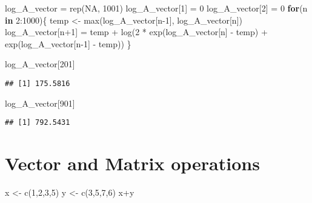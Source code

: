 \documentclass[
]{article}
\newenvironment{Shaded}{\begin{snugshade}}{\end{snugshade}}
\newcommand{\ConstantTok}[1]{\textcolor[rgb]{0.00,0.00,0.00}{#1}}
\newcommand{\ControlFlowTok}[1]{\textcolor[rgb]{0.13,0.29,0.53}{\textbf{#1}}}
\newcommand{\DecValTok}[1]{\textcolor[rgb]{0.00,0.00,0.81}{#1}}
\newcommand{\FunctionTok}[1]{\textcolor[rgb]{0.00,0.00,0.00}{#1}}
\newcommand{\NormalTok}[1]{#1}
\newcommand{\OtherTok}[1]{\textcolor[rgb]{0.56,0.35,0.01}{#1}}
\newcommand{\SpecialCharTok}[1]{\textcolor[rgb]{0.00,0.00,0.00}{#1}}
\begin{document}
\begin{Shaded}
\begin{Highlighting}[]
\NormalTok{log\_A\_vector }\OtherTok{=} \FunctionTok{rep}\NormalTok{(}\ConstantTok{NA}\NormalTok{, }\DecValTok{1001}\NormalTok{)}
\NormalTok{log\_A\_vector[}\DecValTok{1}\NormalTok{] }\OtherTok{=} \DecValTok{0}
\NormalTok{log\_A\_vector[}\DecValTok{2}\NormalTok{] }\OtherTok{=} \DecValTok{0}
\ControlFlowTok{for}\NormalTok{(n }\ControlFlowTok{in} \DecValTok{2}\SpecialCharTok{:}\DecValTok{1000}\NormalTok{)\{}
\NormalTok{  temp }\OtherTok{\textless{}{-}} \FunctionTok{max}\NormalTok{(log\_A\_vector[n}\DecValTok{{-}1}\NormalTok{], log\_A\_vector[n])}
\NormalTok{  log\_A\_vector[n}\SpecialCharTok{+}\DecValTok{1}\NormalTok{] }\OtherTok{=}\NormalTok{ temp }\SpecialCharTok{+} \FunctionTok{log}\NormalTok{(}\DecValTok{2} \SpecialCharTok{*} \FunctionTok{exp}\NormalTok{(log\_A\_vector[n] }\SpecialCharTok{{-}}\NormalTok{ temp) }\SpecialCharTok{+} \FunctionTok{exp}\NormalTok{(log\_A\_vector[n}\DecValTok{{-}1}\NormalTok{] }\SpecialCharTok{{-}}\NormalTok{ temp))}
\NormalTok{\}}

\NormalTok{log\_A\_vector[}\DecValTok{201}\NormalTok{]}
\end{Highlighting}
\end{Shaded}

\begin{verbatim}
## [1] 175.5816
\end{verbatim}

\begin{Shaded}
\begin{Highlighting}[]
\NormalTok{log\_A\_vector[}\DecValTok{901}\NormalTok{]}
\end{Highlighting}
\end{Shaded}

\begin{verbatim}
## [1] 792.5431
\end{verbatim}

\hypertarget{vector-and-matrix-operations}{%
\section{Vector and Matrix
operations}\label{vector-and-matrix-operations}}

\begin{Shaded}
\begin{Highlighting}[]
\NormalTok{x }\OtherTok{\textless{}{-}} \FunctionTok{c}\NormalTok{(}\DecValTok{1}\NormalTok{,}\DecValTok{2}\NormalTok{,}\DecValTok{3}\NormalTok{,}\DecValTok{5}\NormalTok{)}
\NormalTok{y }\OtherTok{\textless{}{-}} \FunctionTok{c}\NormalTok{(}\DecValTok{3}\NormalTok{,}\DecValTok{5}\NormalTok{,}\DecValTok{7}\NormalTok{,}\DecValTok{6}\NormalTok{)}
\NormalTok{x}\SpecialCharTok{+}\NormalTok{y}
\end{Highlighting}
\end{Shaded}
\end{document}
